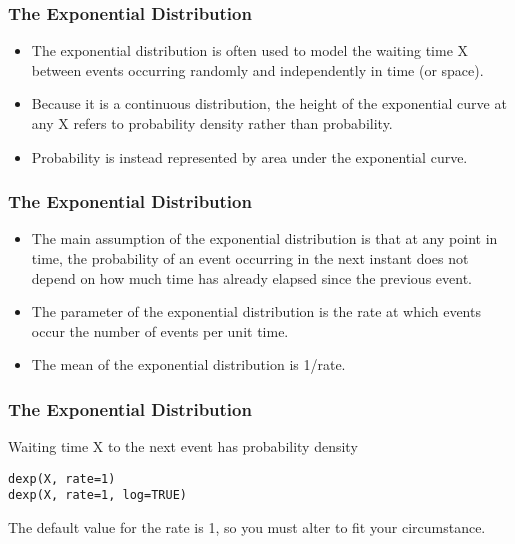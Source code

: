 \documentclass[MAIN.tex]{subfiles}
\begin{document}
 
	\begin{frame}[fragile]
		\frametitle{The Exponential Distribution}
\large
\begin{itemize}
\item The exponential distribution is often used to model the waiting time X between events occurring randomly and independently in time (or space).\item  Because it is a continuous distribution, the height of the exponential curve at any X refers to probability density rather than probability.
\item  Probability is instead represented by area under the exponential curve.
\end{itemize}

\end{frame}
\begin{frame}[fragile]
	\frametitle{The Exponential Distribution}
		\large
\begin{itemize}
\item The main assumption of the exponential distribution is that at any point in time, the probability of an event occurring in the next instant does not depend on how much time has already elapsed since the previous event. 
\item The parameter of the exponential distribution is the rate at which events occur  the number of events per unit time. \item The mean of the exponential distribution is 1/rate.
\end{itemize}

\end{frame}
\begin{frame}[fragile]
	\frametitle{The Exponential Distribution}
	\large

Waiting time X to the next event has probability density

\begin{framed}
\begin{verbatim}
dexp(X, rate=1)
dexp(X, rate=1, log=TRUE)
\end{verbatim}
\end{framed}
The default value for the rate is 1, so you must alter to fit your circumstance.

\end{frame}
\end{document}
